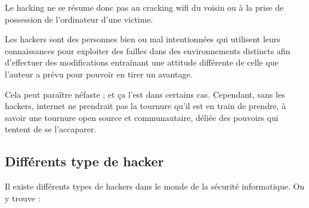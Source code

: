     Le hacking ne se résume donc pas au cracking wifi du voisin ou à la prise de possession de l'ordinateur 
    d'une victime. %

    Les hackers sont des personnes bien ou mal intentionnées qui utilisent leurs connaissances pour exploiter 
    des failles dans des environnements distincts afin d'effectuer des modifications entraînant une attitude 
    différente de celle que l'auteur a prévu pour pouvoir en tirer un avantage. %

    Cela peut paraître néfaste ; et ça l'est dans certains cas. Cependant, sans les hackers, internet ne prendrait 
    pas la tournure qu'il est en train de prendre, à savoir une tournure open source et communautaire, 
    déliée des pouvoirs qui tentent de se l'accaparer. \cite{hacking} %

    \subsection{Différents type de hacker}
    Il existe différents types de hackers dans le monde de la sécurité informatique. On y trouve : %
    \cite{types_de_hacker}

